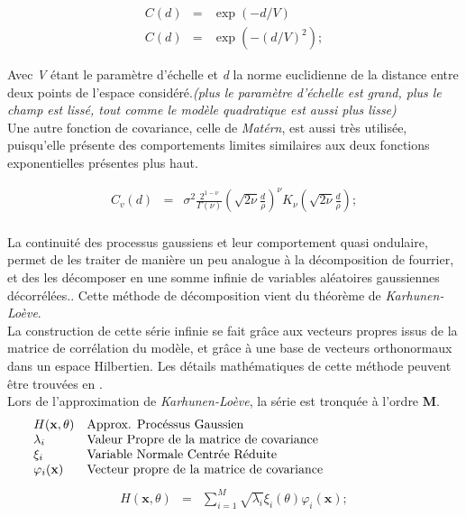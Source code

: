\documentclass[a4paper,10pt]{article}
\begin{document}
   \begin{eqnarray}
      				C(d) & = & \exp(-d/V)\\
                    C(d) & = & \exp(-(d/V)^{2});
   \end{eqnarray}
   
Avec \emph{V} étant le paramètre d'échelle et \emph{d} la norme euclidienne de la distance entre deux points de l'espace considéré.\textit{(plus le paramètre d'échelle est grand, plus le champ est lissé, tout comme le modèle quadratique est aussi plus lisse)}\\
Une autre fonction de covariance, celle de \emph{Matérn}, est aussi très utilisée, puisqu'elle présente des comportements limites similaires aux deux fonctions exponentielles présentes plus haut. 

   \begin{eqnarray}
C_{v}(d) & = & \sigma^{2}\frac{2^{1-\nu}}{\Gamma(\nu)}\left(\sqrt{2\nu}\frac{d}{\rho}\right)^{\nu}K_{\nu}\left(\sqrt{2\nu}\frac{d}{\rho}\right);
   \end{eqnarray}\\

La continuité des processus gaussiens et leur comportement quasi ondulaire, permet de les traiter de manière un peu analogue à la décomposition de fourrier, et des les décomposer en une somme infinie de variables aléatoires gaussiennes décorrélées.. Cette méthode de décomposition vient du théorème de \emph{Karhunen-Loève}. \\
La construction de cette série infinie se fait grâce aux vecteurs propres issus de la matrice de corrélation du modèle, et grâce à une base de vecteurs orthonormaux dans un espace Hilbertien. Les détails mathématiques de cette méthode peuvent être trouvées en  \cite{Sudret2000Jan}. \\
Lors de l’approximation de \emph{Karhunen-Loève}, la série est tronquée à l'ordre \textbf{M}.
   \[
      \begin{array}{lp{0.8\linewidth}}
         H(\textbf{x}, \theta) & Approx. Procéssus Gaussien \\
         \lambda_{i}          & Valeur Propre de la matrice de covariance \\
         \xi_{i}             & Variable Normale Centrée Réduite \\
         \varphi_{i}(\textbf{x}) & Vecteur propre de la matrice de covariance
      \end{array}
   \]
   \begin{eqnarray}
H(\textbf{x}, \theta) & = & \sum_{i=1}^{M}\sqrt{\lambda_{i}}\xi_{i}(\theta)\varphi_{i}(\textbf{x});
   \end{eqnarray}\\
\end{document}
